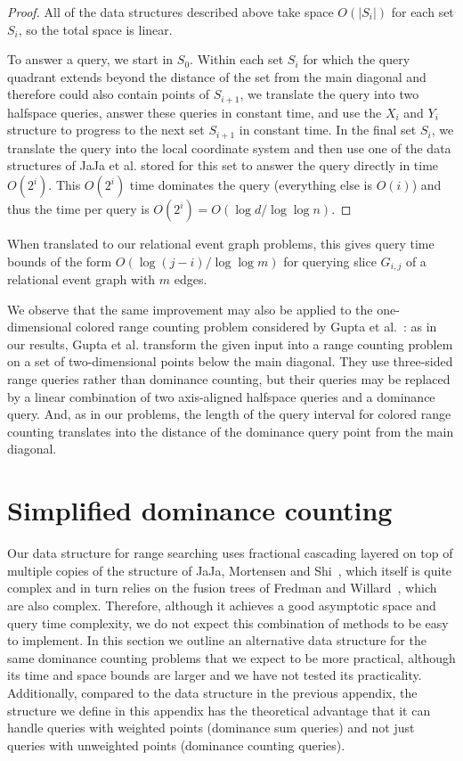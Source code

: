 \documentclass[11pt]{article}
\begin{document}
\begin{proof}
All of the data structures described above take space $O(|S_i|)$ for each set $S_i$, so the total space is linear.

To answer a query, we start in $S_0$. Within each set $S_i$ for which the query quadrant extends beyond the distance of the set from the main diagonal and therefore could also contain points of $S_{i+1}$, we translate the query into two halfspace queries, answer these queries in constant time, and use the $X_i$ and $Y_i$ structure to progress to the next set $S_{i+1}$ in constant time. In the final set $S_i$, we translate the query into the local coordinate system and then use one of the data structures of JaJa et al.{} stored for this set to answer the query directly in time $O(2^i)$. This $O(2^i)$ time dominates the query (everything else is $O(i)$) and thus the time per query is $O(2^i)=O(\log d/\log\log n)$.
\end{proof}

When translated to our relational event graph problems, this gives query time bounds of the form $O(\log(j-i)/\log\log m)$ for querying slice $G_{i,j}$ of a relational event graph with $m$ edges.

We observe that the same improvement may also be applied to the one-dimensional colored range counting problem considered by Gupta et al.~\cite{ColorRangeQueries}: as in our results, Gupta et al.{} transform the given input into a range counting problem on a set of two-dimensional points below the main diagonal. They use three-sided range queries rather than dominance counting, but their queries may be replaced by a linear combination of two axis-aligned halfspace queries and a dominance query. And, as in our problems, the length of the query interval for colored range counting translates into the distance of the dominance query point from the main diagonal.

\section{Simplified dominance counting}
Our data structure for range searching uses fractional cascading layered on top of
multiple copies of the structure of JaJa, Mortensen and Shi~\cite{JaJMorShi-ISAAC-04}, which itself is quite complex and in turn relies on the fusion trees of Fredman and Willard~\cite{FreWil-JCSS-93}, which are also complex. Therefore, although it achieves a good asymptotic space and query time complexity, we do not expect this combination of methods to be easy to implement. In this section we outline an alternative data structure for the same dominance counting problems that we expect to be more practical, although its time and space bounds are larger and we have not tested its practicality. Additionally, compared to the data structure in the previous appendix, the structure we define in this appendix has the theoretical advantage that it can handle queries with weighted points (dominance sum queries) and not just queries with unweighted points (dominance counting queries).
\end{document}
